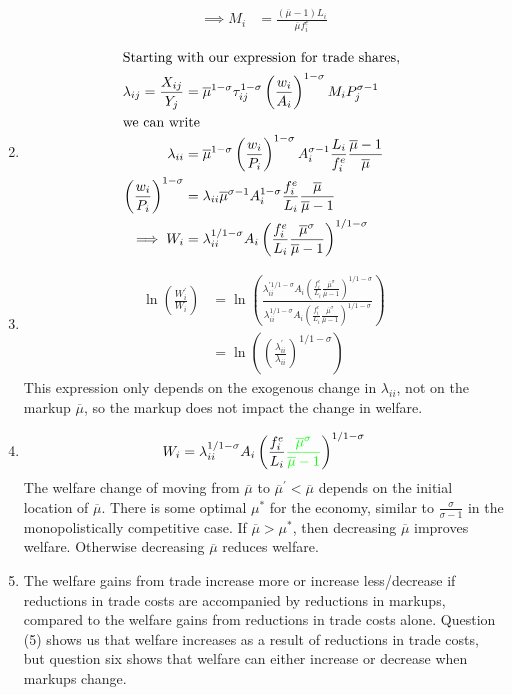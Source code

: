 \begin{enumerate}
\begin{align*}
    \implies M_i &= \frac{(\overline{\mu} - 1)L_i}{\overline{\mu} f_i^e}
  \end{align*}
  \item
    \begin{align*}
     \intertext{Starting with our expression for trade shares, } 
    \lambda_{ij} =\frac{X_{ij}}{Y_j} &= \overline{\mu}^{1 - \sigma} \tau_{ij}^{1 - \sigma}\left(\frac{w_i}{A_i}\right)^{1 - \sigma} M_i P_j^{\sigma - 1}\\
      \intertext{we can write}
      \lambda_{ii} &= \overline{\mu}^{1 - \sigma} \left(\frac{w_i}{P_i}\right)^{1 - \sigma} A_i^{\sigma - 1} \frac{L_i}{f_i^e}\frac{\overline{\mu} - 1}{\overline{\mu}}\\
      \left(\frac{w_i}{P_i}\right)^{1 - \sigma} &= \lambda_{ii} \overline{\mu}^{\sigma - 1} A_i^{1 - \sigma} \frac{f_i^e}{L_i} \frac{\overline{\mu}}{\overline{\mu} - 1}\\
      \implies W_i &= \lambda_{ii}^{1/1 - \sigma} A_i \left(\frac{f_i^e}{L_i} \frac{\overline{\mu}^\sigma}{\overline{\mu} - 1}\right)^{1/1 - \sigma}\\
    \end{align*}
  \item
    \begin{align*}
      \ln \left(\frac{W_i^\prime}{W_i}\right) &= \ln \left(\frac{\lambda_{ii}^{\prime1/1 - \sigma} A_i \left(\frac{f_i^e}{L_i} \frac{\overline{\mu}^\sigma}{\overline{\mu} - 1}\right)^{1/1 - \sigma}}{\lambda_{ii}^{1/1 - \sigma} A_i \left(\frac{f_i^e}{L_i} \frac{\overline{\mu}^\sigma}{\overline{\mu} - 1}\right)^{1/1 - \sigma}}\right)\\
      &= \ln \left(\left(\frac{\lambda_{ii}^{\prime}}{\lambda_{ii} }\right)^{1/1 - \sigma}\right)
    \end{align*}
    This expression only depends on the exogenous change in $\lambda_{ii}$, not on the markup $\overline{\mu}$, so the markup does not impact the change in welfare.
  \item
    \[
W_i = \lambda_{ii}^{1/1 - \sigma} A_i \left(\frac{f_i^e}{L_i} \textcolor{green}{\frac{\overline{\mu}^\sigma}{\overline{\mu} - 1}}\right)^{1/1 - \sigma}
\]
The welfare change of moving from $\overline{\mu}$ to $\overline{\mu}^\prime < \overline{\mu}$ depends on the initial location of $\overline{\mu}$. There is some optimal $\mu^\ast$ for the economy, similar to $\frac{\sigma}{\sigma - 1}$ in the monopolistically competitive case. If $\overline{\mu} > \mu^\ast$, then decreasing $\overline{\mu}$ improves welfare. Otherwise decreasing $\overline{\mu}$ reduces welfare. 

\item  The welfare gains from trade increase more or increase less/decrease if reductions in trade costs are accompanied by reductions in markups, compared to the welfare gains from reductions in trade costs alone. Question (5) shows us that welfare increases as a result of reductions in trade costs, but question six shows that welfare can either increase or decrease when markups change.
\end{enumerate}



